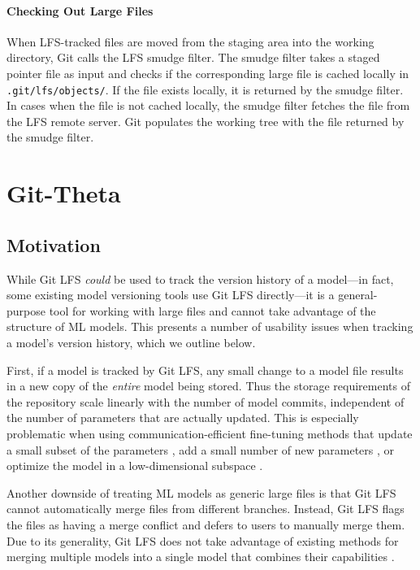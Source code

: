 \documentclass[nohyperref]{article}
\def\code#1{\texttt{#1}}
\theoremstyle{plain}
\theoremstyle{definition}
\theoremstyle{remark}
\begin{document}
\paragraph{Checking Out Large Files}
When LFS-tracked files are moved from the staging area into the working directory, Git calls the LFS smudge filter. The smudge filter takes a staged pointer file as input and checks if the corresponding large file is cached locally in \code{.git/lfs/objects/}. If the file exists locally, it is returned by the smudge filter. In cases when the file is not cached locally, the smudge filter fetches the file from the LFS remote server. Git populates the working tree with the file returned by the smudge filter.

\section{Git-Theta} \label{sec:git_theta}
\subsection{Motivation}
While Git LFS \textit{could} be used to track the version history of a model---in fact, some existing model versioning tools use Git LFS directly---it is a general-purpose tool for working with large files and cannot take advantage of the structure of ML models. This presents a number of usability issues when tracking a model's version history, which we outline below. 

First, if a model is tracked by Git LFS, any small change to a model file results in a new copy of the \emph{entire} model being stored. Thus the storage requirements of the repository scale linearly with the number of model commits, independent of the number of parameters that are actually updated. This is especially problematic when using communication-efficient fine-tuning methods that update a small subset of the parameters \cite{sung2021sparse,guo2020diffpruning,zaken2021bitfit}, add a small number of new parameters \cite{liu2022tfew,hu2021lora,houlsby2019adapter,lester2021tuning,li2021prefix,mahabadi2021compacter}, or optimize the model in a low-dimensional subspace \cite{aghajanyan2020intrinsic}.

Another downside of treating ML models as generic large files is that Git LFS cannot automatically merge files from different branches. Instead, Git LFS flags the files as having a merge conflict and defers to users to manually merge them. Due to its generality, Git LFS does not take advantage of existing methods for merging multiple models into a single model that combines their capabilities \cite{matena2021merging,wortsman2021robust,todo}.
\end{document}
